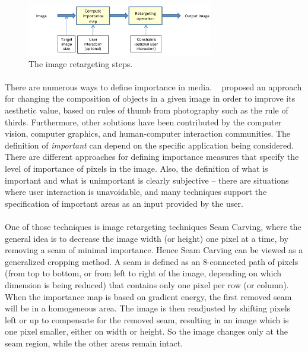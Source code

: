 \documentclass[conference]{acmsiggraph}
\begin{document}
\begin{figure}[ht]
  \centering
  \includegraphics[width=3.2in]{images/retargeting}
  \caption{The image retargeting steps.}
\end{figure}

\paragraph{}
There are numerous ways to define importance in media. ~\cite{Liu2010} proposed an approach for changing the composition of objects in a given image in order to improve its aesthetic value, based on rules of thumb from photography such as the rule of thirds. Furthermore, other solutions have been contributed by the computer vision, computer graphics, and human-computer interaction
communities. The definition of \emph{important} can depend on the specific application being considered. There are different approaches for defining importance measures that specify the level of importance of pixels in the image. Also, the definition of what is important and what is unimportant is clearly subjective -- there are situations where user interaction is unavoidable, and many techniques support the specification of important areas as an input provided by the user.


\paragraph{}
One of those techniques is image retargeting techniques Seam Carving, where the general idea is to decrease the image width (or height) one pixel at a time, by removing a seam of minimal importance. Hence Seam Carving can be viewed as a generalized cropping method. A seam is defined as an 8-connected path of pixels (from top to bottom, or from left to right of the image, depending on which dimension is being reduced) that contains only one pixel per row (or column). When the importance map is based on gradient energy, the first removed seam will be in a homogeneous area. The image is then readjusted by shifting pixels left or up to compensate for the removed seam, resulting in an image which is one pixel smaller, either on width or height. So the image changes only at the seam region, while the other areas remain intact. 
\end{document}
